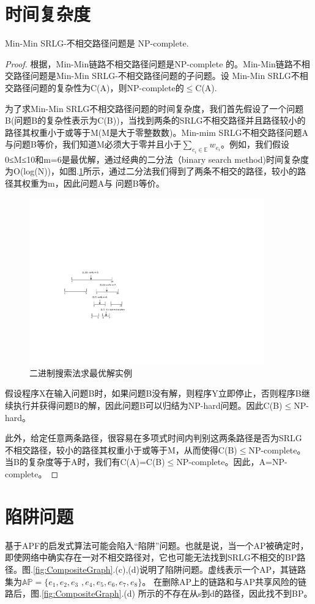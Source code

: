 \section{时间复杂度}
\begin{theorem}
\label{le:lemma1}
    Min-Min SRLG-不相交路径问题是 NP-complete.
\end{theorem}
\begin{proof}
根据\cite{bhatia2006finding}，Min-Min链路不相交路径问题是NP-complete 的。Min-Min链路不相交路径问题是Min-Min SRLG-不相交路径问题的子问题。设
Min-Min SRLG不相交路径问题的复杂性为C(A)，则NP-complete的$\leq$C(A).

为了求Min-Min SRLG不相交路径问题的时间复杂度，我们首先假设了一个问题B(问题B的复杂性表示为C(B))，当找到两条的SRLG不相交路径并且路径较小的路径其权重小于或等于M(M是大于零整数数)。Min-mim SRLG不相交路径问题A与问题B等价，我们知道M必须大于零并且小于$\sum\limits_{e_i\in \mathbb{E}}w_{e_i}$。例如，我们假设0≤M≤10和m=6是最优解，通过经典的二分法（binary search method)时间复杂度为O(log(N))，如图.\ref{fig:binarySearch}所示，通过二分法我们得到了两条不相交的路径，较小的路径其权重为m，因此问题A与 问题B等价。
\begin{figure}[htbp]
  \centering
  \includegraphics[width=4.0in]{figures/binarySearch}
  \caption{二进制搜索法求最优解实例}
  \label{fig:binarySearch}
\end{figure}
假设程序X在输入问题B时，如果问题B没有解，则程序Y立即停止，否则程序B继续执行并获得问题B的解，因此问题B可以归结为NP-hard问题。因此C(B)$\leq$NP-hard。

此外，给定任意两条路径，很容易在多项式时间内判别这两条路径是否为SRLG 不相交路径，较小的路径其权重小于或等于M，从而使得C(B)$\leq$NP-complete。当B的复杂度等于A时，我们有C(A)=C(B)$\leq$NP-complete。因此，A=NP-complete。
\end{proof}
\section{陷阱问题}
基于APF的启发式算法可能会陷入“陷阱”问题。也就是说，当一个AP被确定时，即使网络中确实存在一对不相交路径对，它也可能无法找到SRLG不相交的BP路径。图.\ref{fig:CompositeGraph}.(c),(d)说明了陷阱问题。虚线表示一个AP，其链路集为$\mathbb{AP}=\{e_1,e_2,e_3$ $,e_4,e_5,e_6,e_7,e_8\}$。 在删除AP上的链路和与AP共享风险的链路后，图.\ref{fig:CompositeGraph}.(d) 所示的不存在从s到d的路径，因此找不到BP。

